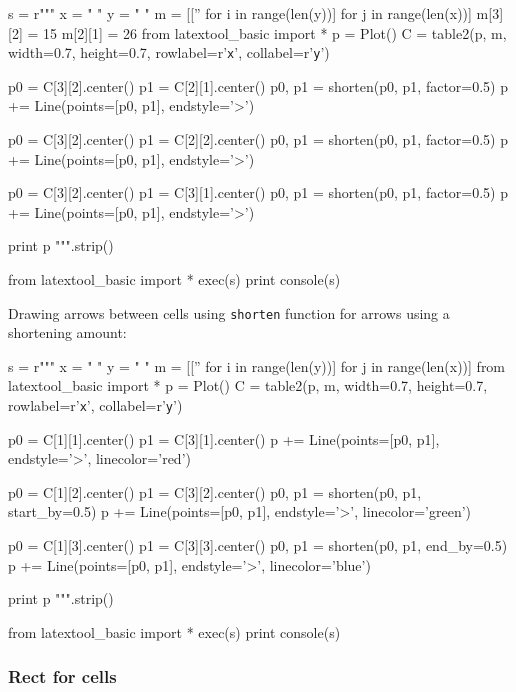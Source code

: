 \begin{python}
s = r"""
x = "     "
y = "      "
m = [['' for i in range(len(y))] for j in range(len(x))]
m[3][2] = 15
m[2][1] = 26
from latextool_basic import *
p = Plot()
C = table2(p, m, width=0.7, height=0.7,
           rowlabel=r'\texttt{x}', collabel=r'\texttt{y}')
           
p0 = C[3][2].center()
p1 = C[2][1].center()
p0, p1 = shorten(p0, p1, factor=0.5)
p += Line(points=[p0, p1], endstyle='>')

p0 = C[3][2].center()
p1 = C[2][2].center()
p0, p1 = shorten(p0, p1, factor=0.5)
p += Line(points=[p0, p1], endstyle='>')

p0 = C[3][2].center()
p1 = C[3][1].center()
p0, p1 = shorten(p0, p1, factor=0.5)
p += Line(points=[p0, p1], endstyle='>')

print p
""".strip()

from latextool_basic import *
exec(s)
print console(s)
\end{python}





\newpage
Drawing arrows between cells using \texttt{shorten} function for arrows
using a shortening amount:

\begin{python}
s = r"""
x = "     "
y = "      "
m = [['' for i in range(len(y))] for j in range(len(x))]
from latextool_basic import *
p = Plot()
C = table2(p, m, width=0.7, height=0.7,
           rowlabel=r'\texttt{x}', collabel=r'\texttt{y}')
           
p0 = C[1][1].center()
p1 = C[3][1].center()
p += Line(points=[p0, p1], endstyle='>', linecolor='red')

p0 = C[1][2].center()
p1 = C[3][2].center()
p0, p1 = shorten(p0, p1, start_by=0.5)
p += Line(points=[p0, p1], endstyle='>', linecolor='green')

p0 = C[1][3].center()
p1 = C[3][3].center()
p0, p1 = shorten(p0, p1, end_by=0.5)
p += Line(points=[p0, p1], endstyle='>', linecolor='blue')

print p
""".strip()

from latextool_basic import *
exec(s)
print console(s)
\end{python}





\newpage
\subsubsection{Rect for cells}

